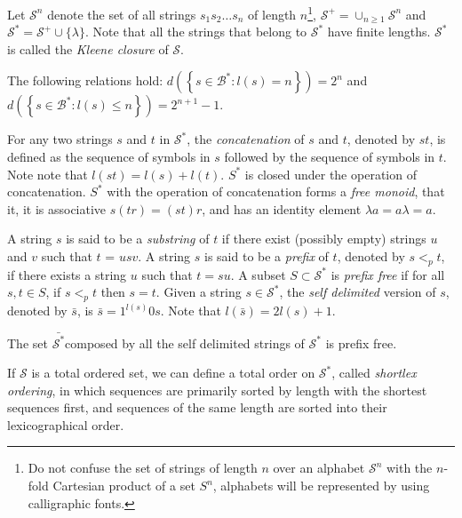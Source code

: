 Let $\mathcal{S}^{n}$ denote the set of all strings $s_{1}s_{2}\ldots s_{n}$ of length $n$\footnote{Do not confuse the set of strings of length $n$ over an alphabet $\mathcal{S}^n$ with the $n$-fold Cartesian product of a set $S^n$, alphabets will be represented by using calligraphic fonts.}, $\mathcal{S}^{+}=\cup_{n\geq1}\mathcal{S}^{n}$ and $\mathcal{S}^{\ast} = \mathcal{S}^{+} \cup \{\lambda\}$. Note that all the strings that belong to $\mathcal{S}^{\ast}$ have finite lengths. $\mathcal{S}^{\ast}$ is called the \emph{Kleene closure} of $\mathcal{S}$.

\begin{example}
The following relations hold: $d \left( \left\{ s \in \mathcal{B}^{\ast} : l(s) = n \right\} \right) = 2^n$ and $d \left( \left\{ s \in \mathcal{B}^{\ast} : l(s) \leq n \right\} \right) = 2^{n+1}-1$.
\end{example}

For any two strings $s$ and $t$ in $\mathcal{S}^{\ast}$, the \emph{concatenation} of $s$ and $t$, denoted by $st$, is defined as the sequence of symbols in $s$ followed by the sequence of symbols in $t$. Note note that $l(st) = l(s) + l(t)$. $S^\ast$ is closed under the operation of concatenation. $S^\ast$ with the operation of concatenation forms a \emph{free monoid}, that it, it is associative  $s(tr)=(st)r$, and has an identity element $\lambda a = a \lambda = a$.

A string $s$ is said to be a \emph{substring} of $t$ if there exist (possibly empty) strings $u$ and $v$ such that $t$ = $usv$. A string $s$ is said to be a \emph{prefix} of $t$, denoted by $s <_p t$, if there exists a string $u$ such that $t = su$. A subset $S \subset \mathcal{S}^{\ast}$ is \emph{prefix free} if for all $s, t \in S$, if $s <_p t$ then $s = t$. Given a string $s \in \mathcal{S}^{\ast}$, the \emph{self delimited} version of $s$, denoted by $\bar{s}$, is $\bar{s} = 1^{l(s)}0s$. Note that $l(\bar{s}) = 2l(s)+1$.

\begin{example}
The set $\bar{\mathcal{S}^{\ast}}$composed by all the self delimited strings of $\mathcal{S}^{\ast}$ is prefix free.
\end{example}

If $\mathcal{S}$ is a total ordered set, we can define a total order on $\mathcal{S}^{\ast}$, called \emph{shortlex ordering}, in which sequences are primarily sorted by length with the shortest sequences first, and sequences of the same length are sorted into their lexicographical order.

